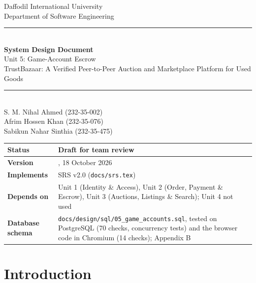 \documentclass[11pt,a4paper]{article}
\begin{document}
\begin{titlepage}
\centering
\vspace*{1cm}
{\Large Daffodil International University}\\[0.2cm]
{\large Department of Software Engineering}\\[2cm]
\rule{\linewidth}{0.5pt}\\[0.4cm]
{\huge\bfseries System Design Document}\\[0.3cm]
{\LARGE Unit 5: Game-Account Escrow}\\[0.3cm]
{\large TrustBazaar: A Verified Peer-to-Peer Auction and Marketplace Platform for Used Goods}\\[0.2cm]
\rule{\linewidth}{0.5pt}\\[1.6cm]
{\large S. M. Nihal Ahmed (232-35-002)\\[0.1cm] Afrim Hossen Khan (232-35-076)\\[0.1cm] Sabikun Nahar Sinthia (232-35-475)}\\[1.6cm]
\begin{tabular}{|l|>{\raggedright\arraybackslash}p{8cm}|}
\hline
\textbf{Status} & Draft for team review \\ \hline
\textbf{Version} & 0.1, 18 October 2026 \\ \hline
\textbf{Implements} & SRS v2.0 (\texttt{docs/srs.tex}) \\ \hline
\textbf{Depends on} & Unit 1 (Identity \& Access), Unit 2 (Order, Payment \& Escrow), Unit 3 (Auctions, Listings \& Search); Unit 4 not used \\ \hline
\textbf{Database schema} & \texttt{docs/design/sql/05\_game\_accounts.sql}, tested on PostgreSQL (70 checks, concurrency tests) and the browser code in Chromium (14 checks); Appendix B \\ \hline
\end{tabular}
\vfill
\end{titlepage}
\tableofcontents
\newpage
\section{Introduction}
\end{document}
